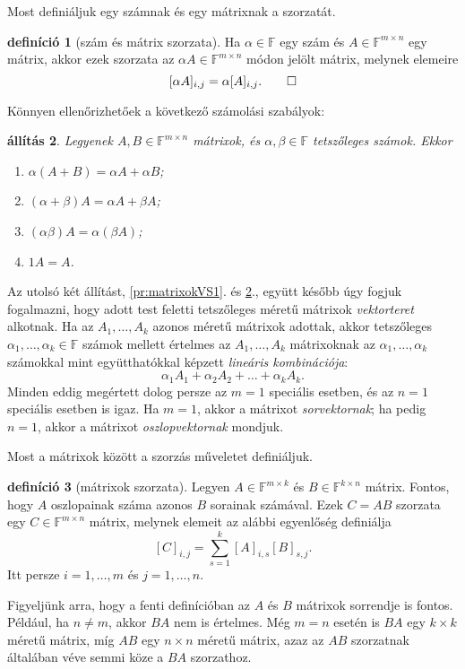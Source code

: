 \documentclass[9pt, a4paper, showtrims]{memoir}
\theoremstyle{plain}
\newtheorem{proposition}{állítás}[chapter]
\theoremstyle{remark}
\theoremstyle{definition}
\newtheorem{definition}[proposition]{definíció}
\begin{document}
Most definiáljuk egy számnak és egy mátrixnak a szorzatát.
\begin{definition}[szám és mátrix szorzata]
	Ha $\alpha\in\mathbb{F}$ egy szám és $A\in\mathbb{F}^{m\times n}$ egy mátrix, akkor ezek szorzata
	az $\alpha A\in\mathbb{F}^{m\times n}$ módon jelölt mátrix, melynek elemeire
	\[
		[\alpha A]_{i,j}=\alpha[A]_{i,j}.\qedhere
	\]
\end{definition}
Könnyen ellenőrizhetőek a következő számolási szabályok:
\begin{proposition}\label{pr:matrixokVS2}
	Legyenek $A,B\in\mathbb{F}^{m\times n}$ mátrixok, és $\alpha,\beta\in\mathbb{F}$ tetszőleges számok.
	Ekkor
	\begin{enumerate}
		\item $\alpha\left( A+B \right)=\alpha A+\alpha B$;
		\item $\left( \alpha+\beta \right)A=\alpha A+\beta A$;
		\item $\left( \alpha\beta \right)A=\alpha\left( \beta A \right)$;
		\item $1 A=A$.\qedhere
	\end{enumerate}
\end{proposition}
Az utolsó két állítást, \ref{pr:matrixokVS1}. és \ref{pr:matrixokVS2}.,
együtt később úgy fogjuk fogalmazni,
hogy adott test feletti tetszőleges méretű mátrixok \emph{vektorteret} alkotnak.
Ha az $A_1,\ldots,A_k$ azonos méretű mátrixok adottak,
akkor tetszőleges $\alpha_1,\ldots,\alpha_k\in\mathbb{F}$
számok mellett értelmes az $A_1,\ldots,A_k$ mátrixoknak az $\alpha_1,\ldots,\alpha_k$ számokkal
mint együtthatókkal képzett \emph{lineáris kombinációja}:
\[
	\alpha_1A_1+\alpha_2A_2+\dots+\alpha_kA_k.
\]
Minden eddig megértett dolog persze az $m=1$ speciális esetben,
és az $n=1$ speciális esetben is igaz.
Ha $m=1$, akkor a mátrixot \emph{sorvektornak};
ha pedig $n=1$, akkor a mátrixot \emph{oszlopvektornak} mondjuk.

Most a mátrixok között a szorzás műveletet definiáljuk.
\begin{definition}[mátrixok szorzata]
	Legyen $A\in\mathbb{F}^{m\times k}$ és $B\in\mathbb{F}^{k\times n}$ mátrix.
	Fontos, hogy $A$ oszlopainak száma azonos $B$ sorainak számával.
	Ezek $C=AB$ szorzata egy $C\in\mathbb{F}^{m\times n}$ mátrix,
	melynek elemeit az alábbi egyenlőség definiálja
	\[
		[C]_{i,j}=\sum_{s=1}^k[A]_{i,s}[B]_{s,j}.
	\]
	Itt persze $i=1,\ldots,m$ és $j=1,\ldots,n.$
\end{definition}
Figyeljünk arra, hogy a fenti definícióban az $A$ és $B$ mátrixok sorrendje is fontos.
Például, ha $n\neq m$, akkor $BA$ nem is értelmes.
Még $m=n$ esetén is $BA$ egy $k\times k$ méretű mátrix, míg $AB$ egy $n\times n$ méretű mátrix,
azaz az $AB$ szorzatnak általában véve semmi köze a $BA$ szorzathoz.
\end{document}
